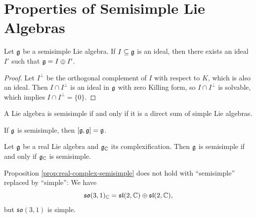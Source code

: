 \section{Properties of Semisimple Lie Algebras}
\begin{theorem}
  Let $\mathfrak{g}$ be a semisimple
  Lie algebra. If $I \subseteq \mathfrak{g}$
  is an ideal, then there exists an ideal
  $I'$ such that $\mathfrak{g} = I \oplus I'$.
\end{theorem}

\pagebreak
\begin{proof}
  Let $I^\perp$ be the orthogonal complement
  of $I$ with respect to $K$, which is
  also an ideal. Then
  $I \cap I^\perp$ is an ideal
  in $\mathfrak{g}$ with zero Killing form, so
  $I \cap I^\perp$ is solvable, which
  implies $I \cap I^\perp = \{0\}$.
\end{proof}

\begin{corollary}
  A Lie algebra is semisimple if and only
  if it is a direct sum of simple
  Lie algebras.
\end{corollary}

\begin{corollary}
  If $\mathfrak{g}$ is semisimple, then
  $[\mathfrak{g}, \mathfrak{g}] = \mathfrak{g}$.
\end{corollary}

\begin{prop}\label{prop:real-complex-semisimple}
  Let $\mathfrak{g}$ be a real Lie algebra and
  $\mathfrak{g}_{\mathbb{C}}$ its complexification. Then
  $\mathfrak{g}$ is semisimple if and only if
  $\mathfrak{g}_{\mathbb{C}}$ is semisimple.
\end{prop}

\begin{remark}
  Proposition
  \ref{prop:real-complex-semisimple}
  does not hold with
  ``semisimple'' replaced by ``simple'':
  We have
  \[\mathfrak{so}(3, 1)_{\mathbb{C}} = \mathfrak{sl}(2, \mathbb{C}) \oplus \mathfrak{sl}(2, \mathbb{C}),\]
  but $\mathfrak{so}(3, 1)$ is simple.
\end{remark}

